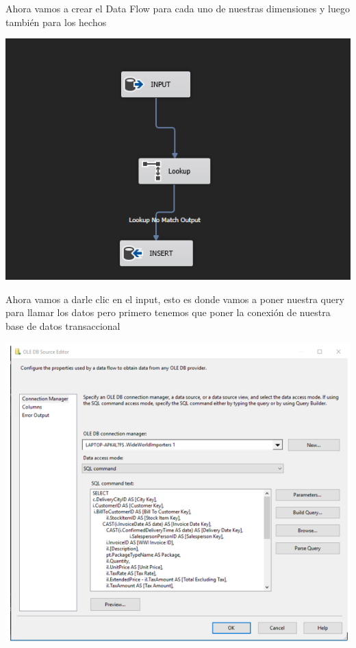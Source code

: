 \documentclass[12pt,letterpaper]{article}
\begin{document}
Ahora vamos a crear el Data Flow para cada uno de nuestras dimensiones y luego tambi\'en para los hechos\\
\begin{center}
\includegraphics[width=17cm]{IMG/34.png} 
\end{center}

Ahora vamos a darle clic en el input, esto es donde vamos a poner nuestra query para llamar los datos pero primero tenemos que poner la conexi\'on de nuestra base de datos transaccional\\
\begin{center}
\includegraphics[width=17cm]{IMG/35-m.png} 
\end{center}
\end{document}
